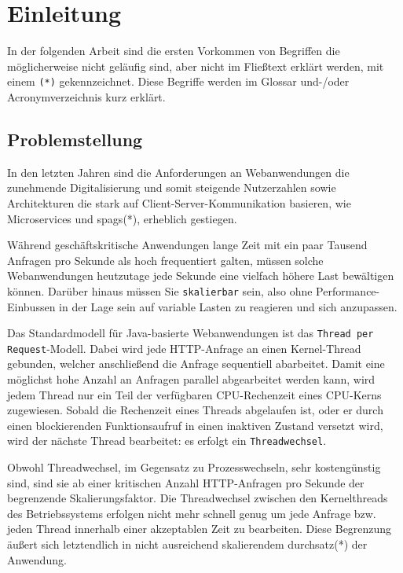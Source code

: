 \section{Einleitung}
\label{sec:einleitung}
In der folgenden Arbeit sind die ersten Vorkommen von Begriffen die möglicherweise nicht geläufig sind, aber
nicht im Fließtext erklärt werden, mit einem \verb|(*)| gekennzeichnet.
Diese Begriffe werden im Glossar und-/oder Acronymverzeichnis kurz erklärt.

\subsection{Problemstellung}
\label{subsec:problemstellung}
In den letzten Jahren sind die Anforderungen an Webanwendungen die zunehmende Digitalisierung und somit steigende Nutzerzahlen
sowie Architekturen die stark auf Client-Server-Kommunikation basieren, wie Microservices und \Glspl{spag}(*), erheblich gestiegen.

Während geschäftskritische Anwendungen lange Zeit mit ein paar Tausend Anfragen pro Sekunde als hoch frequentiert
galten, müssen solche Webanwendungen heutzutage jede Sekunde eine vielfach höhere Last bewältigen können.
Darüber hinaus müssen Sie \verb|skalierbar| sein, also ohne Performance-Einbussen in der Lage sein auf variable Lasten zu reagieren
und sich anzupassen.

Das Standardmodell für Java-basierte Webanwendungen ist das \verb|Thread per Request|-Modell.
Dabei wird jede HTTP-Anfrage an einen Kernel-Thread gebunden, welcher anschließend die Anfrage sequentiell abarbeitet.
Damit eine möglichst hohe Anzahl an Anfragen parallel abgearbeitet werden kann, wird jedem Thread nur ein Teil der verfügbaren
CPU-Rechenzeit eines CPU-Kerns zugewiesen. Sobald die Rechenzeit eines Threads abgelaufen ist, oder er durch einen blockierenden
Funktionsaufruf in einen inaktiven Zustand versetzt wird, wird der nächste Thread bearbeitet: es erfolgt ein \verb|Threadwechsel|.

Obwohl Threadwechsel, im Gegensatz zu Prozesswechseln, sehr kostengünstig sind, sind sie ab einer kritischen Anzahl HTTP-Anfragen
pro Sekunde der begrenzende Skalierungsfaktor. Die Threadwechsel zwischen den Kernelthreads des Betriebssystems erfolgen nicht mehr
schnell genug um jede Anfrage bzw. jeden Thread innerhalb einer akzeptablen Zeit zu bearbeiten.
Diese Begrenzung äußert sich letztendlich in nicht ausreichend skalierendem \Gls{durchsatz}(*) der Anwendung.

